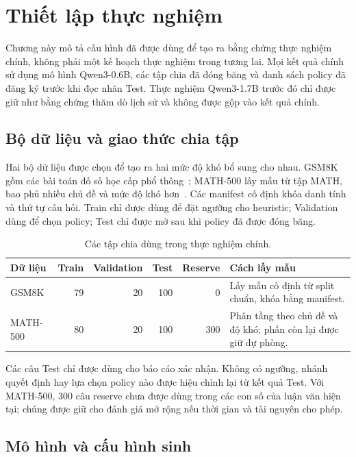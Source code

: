 \chapter{Thiết lập thực nghiệm}
\label{chap:experimental-setup}

Chương này mô tả cấu hình đã được dùng để tạo ra bằng chứng thực nghiệm chính,
không phải một kế hoạch thực nghiệm trong tương lai. Mọi kết quả chính sử dụng
mô hình Qwen3-0.6B, các tập chia đã đóng băng và danh sách policy đã đăng ký
trước khi đọc nhãn Test. Thực nghiệm Qwen3-1.7B trước đó chỉ được giữ như bằng
chứng thăm dò lịch sử và không được gộp vào kết quả chính.

\section{Bộ dữ liệu và giao thức chia tập}

Hai bộ dữ liệu được chọn để tạo ra hai mức độ khó bổ sung cho nhau. GSM8K gồm
các bài toán đố số học cấp phổ thông~\cite{cobbe2021gsm8k}; MATH-500 lấy mẫu
từ tập MATH, bao phủ nhiều chủ đề và mức độ khó hơn~\cite{hendrycks2021math}.
Các manifest cố định khóa danh tính và thứ tự câu hỏi. Train chỉ được dùng để
đặt ngưỡng cho heuristic; Validation dùng để chọn policy; Test chỉ được mở sau
khi policy đã được đóng băng.

\begin{table}[htbp]
  \centering
  \caption{Các tập chia dùng trong thực nghiệm chính.}
  \label{tab:dataset-splits}
  \small
  \begin{tabular}{lrrrrp{}}
    \toprule
    Dữ liệu & Train & Validation & Test & Reserve & Cách lấy mẫu \\
    \midrule
    GSM8K & 79 & 20 & 100 & 0 & Lấy mẫu cố định từ split chuẩn, khóa bằng manifest. \\
    MATH-500 & 80 & 20 & 100 & 300 & Phân tầng theo chủ đề và độ khó; phần còn lại được giữ dự phòng. \\
    \bottomrule
  \end{tabular}
\end{table}

Các câu Test chỉ được dùng cho báo cáo xác nhận. Không có ngưỡng, nhánh quyết
định hay lựa chọn policy nào được hiệu chỉnh lại từ kết quả Test. Với MATH-500,
300 câu reserve chưa được dùng trong các con số của luận văn hiện tại; chúng
được giữ cho đánh giá mở rộng nếu thời gian và tài nguyên cho phép.

\section{Mô hình và cấu hình sinh}

